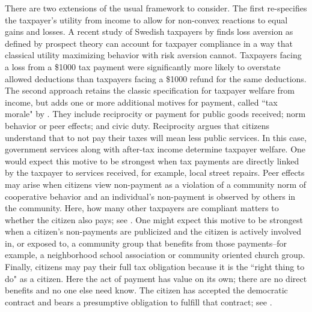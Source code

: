 \documentclass[12pt,titlepage]{article}
\begin{document}
There are two extensions of the usual framework to consider. 
The first re-specifies the taxpayer’s utility from income to allow for
non-convex reactions to equal gains and losses.  A recent study of 
Swedish taxpayers by \citet{engstrom} finds loss aversion 
as defined by prospect theory can account for taxpayer compliance in 
a way that classical utility maximizing behavior with risk aversion 
cannot.  Taxpayers facing a loss from a \$1000 tax payment were
significantly more likely to overstate allowed deductions than
taxpayers facing a \$1000 refund for the same deductions.  
The second approach retains the classic specification for 
taxpayer welfare from income, but adds one or more additional 
motives for payment, called ``tax morale" by \citet{luttmer}.  
They include reciprocity or payment for public goods received; 
norm behavior or peer effects; and civic duty.   Reciprocity argues 
that citizens understand that to not pay their taxes will mean less 
public services.   In this case, government services along with 
after-tax income determine taxpayer welfare.  One would expect this 
motive to be strongest when tax payments are directly linked by the 
taxpayer to services received, for example, local street repairs.   
Peer effects may arise when citizens view non-payment as a violation 
of a community norm of cooperative behavior and an individual’s 
non-payment is observed by others in the community.  Here, how many 
other taxpayers are compliant matters to whether the citizen 
also pays; see \citet{posner}.   One might expect this motive to be 
strongest when a citizen’s non-payments are publicized and the citizen 
is actively involved in, or exposed to,  a community group that benefits 
from those payments--for example, a neighborhood school association or 
community oriented church group.  Finally, citizens may pay their full 
tax obligation because it is the ``right thing to do" as a citizen.  
Here the act of payment has value on its own; there are no direct 
benefits and no one else need know.  The citizen has accepted the 
democratic contract and bears a presumptive obligation to fulfill 
that contract; see \citet[350-355]{rawls}.  
\end{document}
